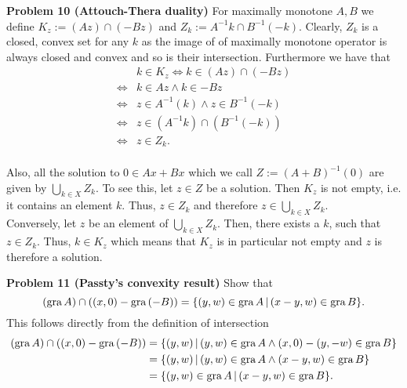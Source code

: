 \documentclass{scrartcl}
\theoremstyle{plain}
\theoremstyle{remark}
\newcommand{\gr}{\textup{gra}\,}
\begin{document}
\textbf{Problem 10 (Attouch-Thera duality)} For maximally monotone $A,B$ we define $K_{z} := (Az) \cap (-Bz)$ and $Z_{k} := A^{-1}k \cap B^{-1}(-k)$. Clearly, $Z_{k}$ is a closed, convex set for any $k$ as the image of of maximally monotone operator is always closed and convex and so is their intersection.
Furthermore we have that
\begin{equation}
  \begin{aligned}
    & k \in K_{z} \Leftrightarrow k \in (Az) \cap (-Bz) \\
    \Leftrightarrow& k \in Az \wedge k \in -Bz \\
    \Leftrightarrow& z \in A^{-1}(k) \wedge z \in B^{-1}(-k) \\
    \Leftrightarrow& z \in (A^{-1}k) \cap (B^{-1}(-k)) \\
    \Leftrightarrow& z \in Z_{k}.
  \end{aligned}
\end{equation}\\
Also, all the solution to $0 \in Ax + Bx$ which we call $Z:= {(A + B)}^{-1}(0)$ are given by $\bigcup_{k \in X} Z_{k}$. To see this, let $z \in Z$ be a solution. Then $K_{z}$ is not empty, i.e. it contains an element $k$. 
Thus, $z \in Z_{k}$ and therefore $z \in \bigcup_{k \in X} Z_{k}$.\\
Conversely, let $z$ be an element of $\bigcup_{k \in X} Z_{k}$. Then, there exists a $k$, such that $z \in Z_{k}$. Thus, $k \in K_{z}$ which means that $K_{z}$ is in particular not empty and $z$ is therefore a solution.

\textbf{Problem 11 (Passty's convexity result)} Show that
\begin{equation}
  (\gr A) \cap ((x,0) - \gr (-B)) = \{(y,w) \in \gr A \,| \,(x-y,w) \in \gr B\}.
\end{equation}
This follows directly from the definition of intersection
\begin{equation}
  \begin{aligned}
    (\gr A) \cap ((x,0) - \gr (-B)) &= \{(y,w) \,| \,(y,w) \in \gr A \wedge (x,0) - (y,-w) \in \gr B\} \\
    &= \{(y,w) \,| \,(y,w) \in \gr A \wedge (x-y,w) \in \gr B\} \\
    &= \{(y,w) \in \gr A \,| \,(x-y,w) \in \gr B\}.
  \end{aligned}
\end{equation}\\
\end{document}
